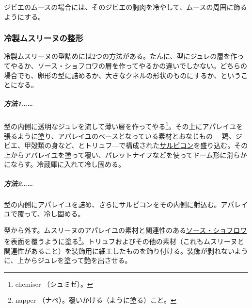 \begin{recette}
ジビエのムースの場合には、そのジビエの胸肉を冷やして、ムースの周囲に飾るようにする。

\hypertarget{moulage-des-mousselines-froides}{%
\subsubsection{冷製ムスリーヌの整形}\label{moulage-des-mousselines-froides}}



冷製ムスリーヌの型詰めには2つの方法がある。たんに、型にジュレの層を作ってやるか、ソース・ショフロワの層を作ってやるかの違いでしかない。どちらの場合でも、卵形の型に詰めるか、大きなクネルの形状のものにするか、ということになる。

\hypertarget{procede-un-moulage-des-mousselines-froides}{%
\subparagraph{方法1\ldots{}\ldots{}}\label{procede-un-moulage-des-mousselines-froides}}

型の内側に透明なジュレを流して薄い層を作ってやる\footnote{chemiser
  （シュミゼ）。}。その上にアパレイユを張るように塗り、アパレイユのベースとなっている素材とおなじもの---
鶏、ジビエ、甲殻類の身など、とトリュフ---で構成された\protect\hyperlink{salpicons-divers}{サルピコン}を盛り込む。その上からアパレイユを塗って覆い、パレットナイフなどを使ってドーム形に滑らかにならす。冷蔵庫に入れて冷し固める。

\hypertarget{procede-deux-moulage-des-mousselines-froides}{%
\subparagraph{方法2\ldots{}\ldots{}}\label{procede-deux-moulage-des-mousselines-froides}}

型の内側にアパレイユを詰め、さらにサルピコンをその内側に射込む。アパレイユで覆って、冷し固める。

型から外す。ムスリーヌのアパレイユの素材と関連性のある\protect\hyperlink{sauce-chaud-froid-ordinaire}{ソース・ショフロワ}を表面を覆うように塗る\footnote{napper
  （ナペ）。覆いかける（ように塗る）こと。}。トリュフおよびその他の素材（これもムスリーヌと関連性があること）を装飾用に細工したものを飾り付ける。装飾が剥れないように、上からジュレを塗って艶を出させる。


\end{recette}
